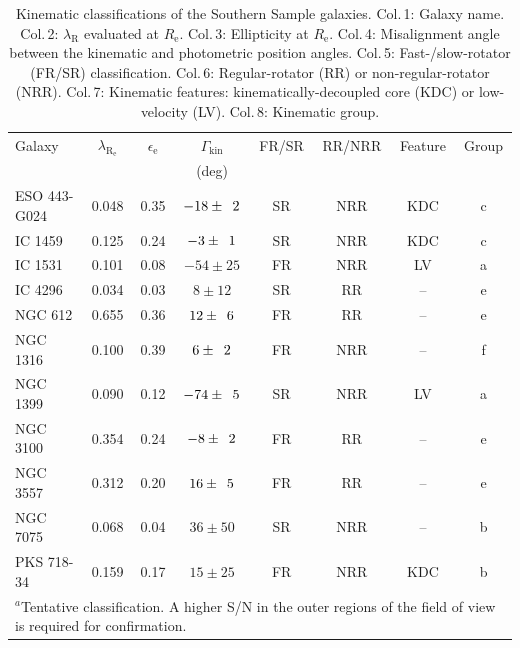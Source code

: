 \documentclass[a4paper,fleqn,usenatbib]{mnras}
\begin{document}
	\begin{table}
		\centering
		\caption{Kinematic classifications of the Southern Sample galaxies. Col.\,1: Galaxy name. Col.\,2: $\lambda_\text{R}$ evaluated at $R_\text{e}$. Col.\,3: Ellipticity at $R_\text{e}$. Col.\,4: Misalignment angle between the kinematic and photometric position angles. Col.\,5: Fast-/slow-rotator (FR/SR) classification. Col.\,6: Regular-rotator (RR) or non-regular-rotator (NRR). Col.\,7: Kinematic features: kinematically-decoupled core (KDC) or low-velocity (LV). Col.\,8: Kinematic group.}
		\label{tab:classify}
		\begin{tabular}{l c c c c c c c}
			\hline
			\hline
			Galaxy		& $\lambda_\mathrm{R_e}$ & $\epsilon_\text{e}$  & $\Gamma_\text{kin}$ & FR/SR 	& RR/NRR 	& Feature & Group 	\\
			 & & & (deg) \\
			\hline 
			ESO 443-G024 & 0.048 & 0.35 & $-18\pm\leavevmode\phantom{0}2$	& SR & NRR & KDC & c \\
			IC 1459 	& 0.125 & 0.24 & \leavevmode\phantom{0}$-3\pm\leavevmode\phantom{0}1$ & SR & NRR & KDC & c \\
			IC 1531 	& 0.101 & 0.08 & $-54\pm25$	& FR & NRR & LV & a \\
			IC 4296		& 0.034 & 0.03 & \leavevmode\phantom{$-0$}$8\pm12$ & SR &\leavevmode\phantom{N}RR & -- & e \\
			NGC 612 	& 0.655 & 0.36 & \leavevmode\phantom{$-$}$12\pm\leavevmode\phantom{0}6$	& FR &\leavevmode\phantom{N}RR & -- & e \\
			NGC 1316 	& 0.100 & 0.39 & \leavevmode\phantom{$-0$}$6\pm\leavevmode\phantom{0}2$ & FR & NRR & -- & f \\
			NGC 1399 	& 0.090 & 0.12 & $-74\pm\leavevmode\phantom{0}5$ & SR & NRR & LV & a \\
			NGC 3100 	& 0.354 & 0.24 & \leavevmode\phantom{0}$-8\pm\leavevmode\phantom{0}2$ & FR &\leavevmode\phantom{N}RR & -- & e \\
			NGC 3557 	& 0.312 & 0.20 & \leavevmode\phantom{$-$}$16\pm\leavevmode\phantom{0}5$ & FR &\leavevmode\phantom{N}RR & -- & e\\
			NGC 7075 	& 0.068 & 0.04 & \leavevmode\phantom{$-$}$36\pm50$ & SR & NRR & -- & b \\
			PKS 718-34  & 0.159 & 0.17 & \leavevmode\phantom{$-$}$15\pm25$ & FR & NRR & KDC\tnote{a} & b\\
			\hline
			\hline
			\multicolumn{8}{L{.7\linewidth}}{$^{a}$Tentative classification. A higher S/N in the outer regions of the field of view is required for confirmation.}


\end{tabular}
\end{table}
\end{document}

